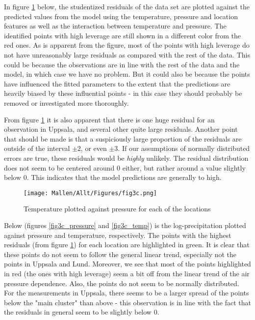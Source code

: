 In figure \ref{fig3c} below, the studentized residuals of the data set are plotted against the predicted values from the model using the temperature, pressure and location features as well as the interaction between temperature and pressure. The identified points with high leverage are still shown in a different color from the red ones. As is apparent from the figure, most of the points with high leverage do not have unreasonably large residuals as compared with the rest of the data. This could be because the observations are in line with the rest of the data and the model, in which case we have no problem. But it could also be because the points have influenced the fitted parameters to the extent that the predictions are heavily biased by these influential points - in this case they should probably be removed or investigated more thoroughly.

From figure \ref{fig3c} it is also apparent that there is one huge residual for an observation in Uppsala, and several other quite large residuals. Another point that should be made is that a suspiciously large proportion of the residuals are outside of the interval $\pm 2$, or even $\pm 3$. If our assumptions of normally distributed errors are true, these residuals would be \textit{highly} unlikely. The residual distribution does not seem to be centered around 0 either, but rather around a value slightly below 0. This indicates that the model predictions are generally to high. 

\begin{figure}[H]
\centering
	\texttt{[image: Mallen/Allt/Figures/fig3c.png]}    		\caption{Temperature plotted against pressure for each of the locations}
    \label{fig3c}
\end{figure}

Below (figures \ref{fig3c_pressure} and \ref{fig3c_temp}) is the log-precipitation plotted against pressure and temperature, respectively. The points with the highest residuals (from figure \ref{fig3c}) for each location are highlighted in green. It is clear that these points do not seem to follow the general linear trend, especially not the points in Uppsala and Lund. Moreover, we see that most of the points highlighted in red (the ones with high leverage) seem a bit off from the linear trend of the air pressure dependence. Also, the points do not seem to be normally distributed. For the measurements in Uppsala, there seems to be a larger spread of the points below the "main cluster" than above - this observation is in line with the fact that the residuals in general seem to be slightly below 0. 

